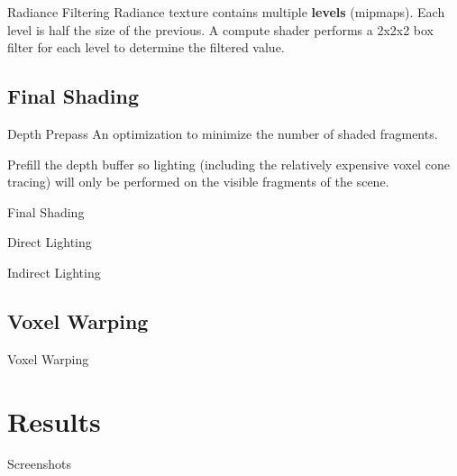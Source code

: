 \documentclass[10pt]{beamer}
\begin{document}
\begin{frame}{Radiance Filtering}
  Radiance texture contains multiple \textbf{levels} (mipmaps). Each level is half the size of the previous. A compute shader performs a 2x2x2 box filter for each level to determine the filtered value.

\end{frame}

\subsection{Final Shading}
\begin{frame}{Depth Prepass}
  An optimization to minimize the number of shaded fragments.

  Prefill the depth buffer so lighting (including the relatively expensive voxel cone tracing) will only be performed on the visible fragments of the scene. %
\end{frame}

\begin{frame}{Final Shading}
\end{frame}

\begin{frame}{Direct Lighting}
\end{frame}

\begin{frame}{Indirect Lighting}
\end{frame}

\subsection{Voxel Warping}
\begin{frame}{Voxel Warping}
\end{frame}


\section{Results}

\begin{frame}{Screenshots}
\end{frame}
\end{document}
